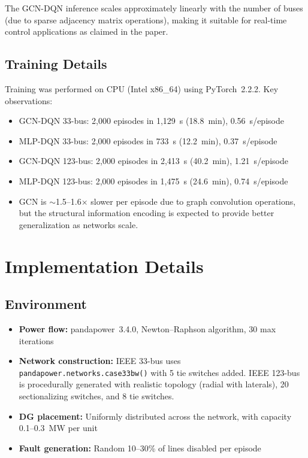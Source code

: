 \documentclass[11pt]{article}
\begin{document}
\noindent The GCN-DQN inference scales approximately linearly with the number of buses (due to sparse adjacency matrix operations), making it suitable for real-time control applications as claimed in the paper.

\subsection{Training Details}

Training was performed on CPU (Intel x86\_64) using PyTorch~2.2.2. Key observations:
\begin{itemize}[leftmargin=*]
    \item GCN-DQN 33-bus: 2,000 episodes in 1,129~s (18.8~min), 0.56~s/episode
    \item MLP-DQN 33-bus: 2,000 episodes in 733~s (12.2~min), 0.37~s/episode
    \item GCN-DQN 123-bus: 2,000 episodes in 2,413~s (40.2~min), 1.21~s/episode
    \item MLP-DQN 123-bus: 2,000 episodes in 1,475~s (24.6~min), 0.74~s/episode
    \item GCN is $\sim$1.5--1.6$\times$ slower per episode due to graph convolution operations, but the structural information encoding is expected to provide better generalization as networks scale.
\end{itemize}

\section{Implementation Details}

\subsection{Environment}
\begin{itemize}[leftmargin=*]
    \item \textbf{Power flow:} pandapower~3.4.0, Newton--Raphson algorithm, 30 max iterations
    \item \textbf{Network construction:} IEEE 33-bus uses \texttt{pandapower.networks.case33bw()} with 5 tie switches added. IEEE 123-bus is procedurally generated with realistic topology (radial with laterals), 20 sectionalizing switches, and 8 tie switches.
    \item \textbf{DG placement:} Uniformly distributed across the network, with capacity 0.1--0.3~MW per unit
    \item \textbf{Fault generation:} Random 10--30\% of lines disabled per episode
\end{itemize}
\end{document}

